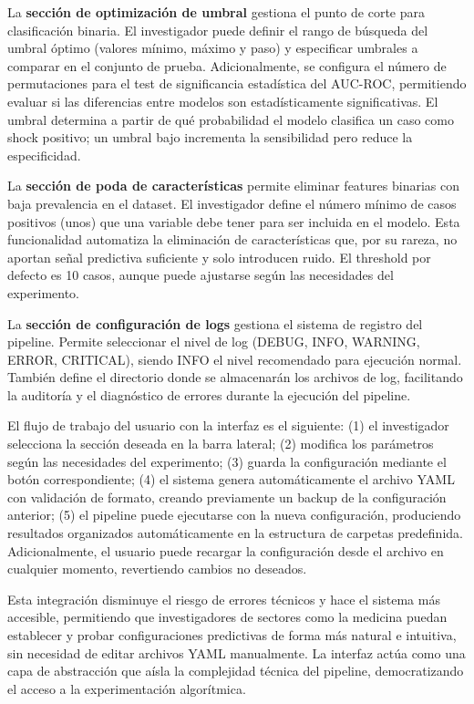 La \textbf{sección de optimización de umbral} gestiona el punto de corte para clasificación binaria. El investigador puede definir el rango de búsqueda del umbral óptimo (valores mínimo, máximo y paso) y especificar umbrales a comparar en el conjunto de prueba. Adicionalmente, se configura el número de permutaciones para el test de significancia estadística del AUC-ROC, permitiendo evaluar si las diferencias entre modelos son estadísticamente significativas. El umbral determina a partir de qué probabilidad el modelo clasifica un caso como shock positivo; un umbral bajo incrementa la sensibilidad pero reduce la especificidad.

La \textbf{sección de poda de características} permite eliminar features binarias con baja prevalencia en el dataset. El investigador define el número mínimo de casos positivos (unos) que una variable debe tener para ser incluida en el modelo. Esta funcionalidad automatiza la eliminación de características que, por su rareza, no aportan señal predictiva suficiente y solo introducen ruido. El threshold por defecto es 10 casos, aunque puede ajustarse según las necesidades del experimento.

La \textbf{sección de configuración de logs} gestiona el sistema de registro del pipeline. Permite seleccionar el nivel de log (DEBUG, INFO, WARNING, ERROR, CRITICAL), siendo INFO el nivel recomendado para ejecución normal. También define el directorio donde se almacenarán los archivos de log, facilitando la auditoría y el diagnóstico de errores durante la ejecución del pipeline.

El flujo de trabajo del usuario con la interfaz es el siguiente: (1) el investigador selecciona la sección deseada en la barra lateral; (2) modifica los parámetros según las necesidades del experimento; (3) guarda la configuración mediante el botón correspondiente; (4) el sistema genera automáticamente el archivo YAML con validación de formato, creando previamente un backup de la configuración anterior; (5) el pipeline puede ejecutarse con la nueva configuración, produciendo resultados organizados automáticamente en la estructura de carpetas predefinida. Adicionalmente, el usuario puede recargar la configuración desde el archivo en cualquier momento, revertiendo cambios no deseados.

Esta integración disminuye el riesgo de errores técnicos y hace el sistema más accesible, permitiendo que investigadores de sectores como la medicina puedan establecer y probar configuraciones predictivas de forma más natural e intuitiva, sin necesidad de editar archivos YAML manualmente. La interfaz actúa como una capa de abstracción que aísla la complejidad técnica del pipeline, democratizando el acceso a la experimentación algorítmica.

\newpage

